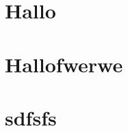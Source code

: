 \documentclass[12pt,ngerman]{scrartcl}
\begin{document}
\tableofcontents

\section{Hallo}

\blindtext

\section{Hallofwerwe}

\blindtext

\section{sdfsfs}

\blindtext
\end{document}
